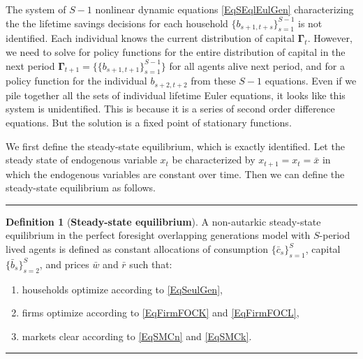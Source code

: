 \documentclass[letterpaper,12pt]{article}
\theoremstyle{definition}
\newtheorem{definition}[theorem]{Definition}
\numberwithin{equation}{section}
\numberwithin{exercise}{section}
\begin{document}
\begin{spacing}{1.5}
      The system of $S-1$ nonlinear dynamic equations \eqref{EqSEqlEulGen} characterizing the the lifetime savings decisions for each household $\{b_{s+1,t+s}\}_{s=1}^{S-1}$ is not identified. Each individual knows the current distribution of capital $\bm{\Gamma}_t$. However, we need to solve for policy functions for the entire distribution of capital in the next period $\bm{\Gamma}_{t+1}=\{\{b_{s+1,t+1}\}_{s=1}^{S-1}\}$ for all agents alive next period, and for a policy function for the individual $b_{s+2,t+2}$ from these $S-1$ equations. Even if we pile together all the sets of individual lifetime Euler equations, it looks like this system is unidentified. This is because it is a series of second order difference equations. But the solution is a fixed point of stationary functions.

      We first define the steady-state equilibrium, which is exactly identified. Let the steady state of endogenous variable $x_t$ be characterized by $x_{t+1}=x_t=\bar{x}$ in which the endogenous variables are constant over time. Then we can define the steady-state equilibrium as follows.

      \end{spacing}
      \vspace{5mm}
      \hrule
      \vspace{-1mm}
      \begin{definition}[\textbf{Steady-state equilibrium}]\label{DefSperSimpSSEql}
         A non-autarkic steady-state equilibrium in the perfect foresight overlapping generations model with $S$-period lived agents is defined as constant allocations of consumption $\{\bar{c}_s\}_{s=1}^S$, capital $\{\bar{b}_s\}_{s=2}^S$, and prices $\bar{w}$ and $\bar{r}$ such that:
         \begin{enumerate}
            \item households optimize according to \eqref{EqSeulGen},
            \item firms optimize according to \eqref{EqFirmFOCK} and \eqref{EqFirmFOCL},
            \item markets clear according to \eqref{EqSMCn} and \eqref{EqSMCk}.
         \end{enumerate}
      \end{definition}
      \vspace{-2mm}
      \hrule
      \vspace{5mm}
\end{document}
